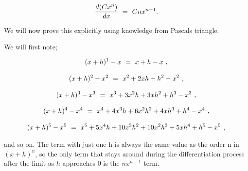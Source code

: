 \documentclass{article}
\begin{document}
\begin{equation} \label{eb-eq-314-1}
\frac{d(C x^n)}{dx} \hspace{0.125cm} = \hspace{0.125cm} C n x^{n-1}.
\end{equation}

We will now prove this explicitly using knowledge from Pascals triangle. 

We will first note;

\begin{equation} \label{eb-eq-315-1}
(x + h)^1  - x \hspace{0.125cm} = \hspace{0.125cm} x + h - x \hspace{0.125cm} ,
\end{equation}

\begin{equation} \label{eb-eq-316-1}
(x + h)^2 - x^2 \hspace{0.125cm} = \hspace{0.125cm} x^2 + 2xh + h^2 - x^2 \hspace{0.125cm} ,
\end{equation}

\begin{equation} \label{eb-eq-317-1}
(x + h)^3 - x^3 \hspace{0.125cm} = \hspace{0.125cm} x^3 + 3x^2 h + 3x h^2 + h^3 - x^3 \hspace{0.125cm} ,
\end{equation}

\begin{equation} \label{eb-eq-318-1}
(x + h)^4 - x^4 \hspace{0.125cm} = \hspace{0.125cm} x^4 + 4x^3 h + 6x^2 h^2 + 4xh^3 + h^4 - x^4 \hspace{0.125cm} ,
\end{equation}

\begin{equation} \label{eb-eq-319-1}
(x + h)^5 - x^5 \hspace{0.125cm} = \hspace{0.125cm} x^5 + 5x^4 h + 10x^3 h^2 + 10x^2 h^3 + 5xh^4 + h^5 - x^5 \hspace{0.125cm} ,
\end{equation}

and so on. The term with just one h is always the same value as the order n in \begin{math} (x + h)^n \end{math}, so the only term that stays around during the differentiation process after the limit as \begin{math} h \end{math} approaches \begin{math} 0 \end{math} is the \begin{math} n x^{n - 1} \end{math} term. 
\end{document}
